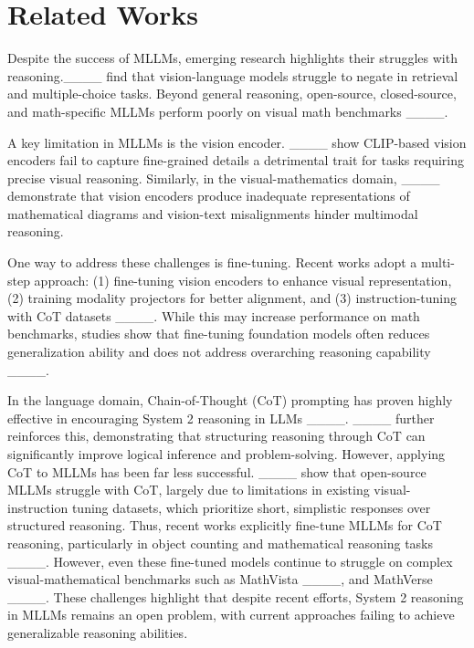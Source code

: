 \section{Related Works}
Despite the success of MLLMs, emerging research highlights their struggles with reasoning.____ find that vision-language models struggle to negate in retrieval and multiple-choice tasks. Beyond general reasoning, open-source, closed-source, and math-specific MLLMs perform poorly on visual math benchmarks ____. 

A key limitation in MLLMs is the vision encoder. ____ show CLIP-based vision encoders fail to capture fine-grained details \textemdash a detrimental trait for tasks requiring precise visual reasoning. Similarly, in the visual-mathematics domain, ____ demonstrate that vision encoders produce inadequate representations of mathematical diagrams and vision-text misalignments  hinder multimodal reasoning.

One way to address these challenges is fine-tuning. Recent works adopt a multi-step approach: (1) fine-tuning vision encoders to enhance visual representation, (2) training modality projectors for better alignment, and (3) instruction-tuning with CoT datasets ____. While this may increase performance on math benchmarks, studies show that fine-tuning foundation models often reduces generalization ability and does not address overarching reasoning capability ____.

In the language domain, Chain-of-Thought (CoT) prompting has proven highly effective in encouraging System 2 reasoning in LLMs ____. ____ further reinforces this, demonstrating that structuring reasoning through CoT can significantly improve logical inference and problem-solving. However, applying CoT to MLLMs has been far less successful. ____ show that open-source MLLMs struggle with CoT, largely due to limitations in existing visual-instruction tuning datasets, which prioritize short, simplistic responses over structured reasoning. Thus, recent works explicitly fine-tune MLLMs for CoT reasoning, particularly in object counting and mathematical reasoning tasks ____. However, even these fine-tuned models continue to struggle on complex visual-mathematical benchmarks such as MathVista ____, and MathVerse ____. These challenges highlight that despite recent efforts, System 2 reasoning in MLLMs remains an open problem, with current approaches failing to achieve generalizable reasoning abilities.